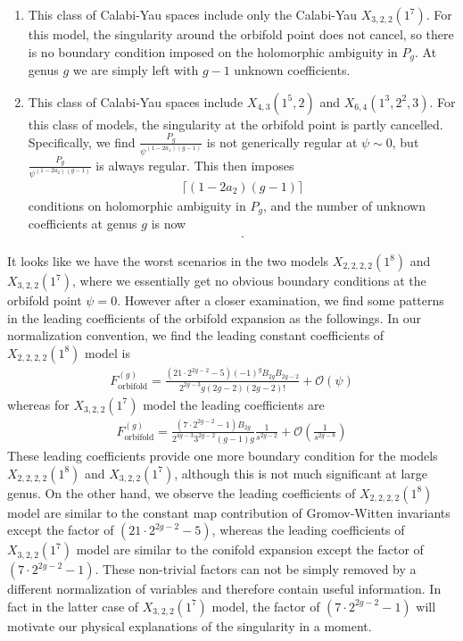 \documentclass[12pt]{article}
\begin{document}
\begin{enumerate}
\item This class of Calabi-Yau spaces include only the Calabi-Yau $X_{3,2,2}(1^7)$.
For this model, the singularity around the orbifold point does not
cancel, so there is no boundary condition imposed on the
holomorphic ambiguity in $P_g$. At genus $g$ we are simply left
with $g-1$ unknown coefficients.

\item This class of Calabi-Yau spaces include $X_{4,3}(1^5,2)$ and
$X_{6,4}(1^3,2^2,3)$. For this class of models, the singularity at
the orbifold point is partly cancelled. Specifically, we find
$\frac{P_g}{\psi^{(1-2a_1)(g-1)}}$ is not generically regular at
$\psi\sim 0$, but $\frac{P_g}{\psi^{(1-2a_2)(g-1)}}$ is always
regular. This then imposes
\begin{eqnarray}
\lceil(1-2a_2)(g-1)\rceil
\end{eqnarray}
conditions on holomorphic ambiguity in $P_g$, and the number of
unknown coefficients at genus $g$ is now
\begin{eqnarray}
[2a_2(g-1)].
\end{eqnarray}

\end{enumerate}

It looks like we have the worst scenarios in the two models
$X_{2,2,2,2}(1^8)$ and $X_{3,2,2}(1^7)$, where we essentially get
no obvious boundary conditions at the orbifold point $\psi=0$.
However after a closer examination, we find some patterns in the
leading coefficients of the orbifold expansion as the followings.
In our normalization convention, we find the leading constant
coefficients of $X_{2,2,2,2}(1^8)$ model is
\begin{eqnarray}
F^{(g)}_{\textrm{orbifold}}=\frac{(21\cdot2^{2g-2}-5)(-1)^{g}B_{2g}B_{2g-2}}{2^{2g-3}g(2g-2)(2g-2)!}
+\mathcal{O}(\psi)
\end{eqnarray}
whereas for $X_{3,2,2}(1^7)$ model the leading coefficients are
\begin{eqnarray} \label{twoparticles-12-01}
F^{(g)}_{\textrm{orbifold}}=
\frac{(7\cdot2^{2g-2}-1)B_{2g}}{2^{4g-3}3^{2g-2}(g-1)g}
\frac{1}{s^{2g-2}}+\mathcal{O}(\frac{1}{s^{2g-8}})
\end{eqnarray}
These leading coefficients provide one more boundary condition for
the models $X_{2,2,2,2}(1^8)$ and $X_{3,2,2}(1^7)$, although this
is not much significant at large genus. On the other hand, we
observe the leading coefficients of $X_{2,2,2,2}(1^8)$ model are
similar to the constant map contribution of Gromov-Witten
invariants except the factor of $(21\cdot2^{2g-2}-5)$, whereas the
leading coefficients of $X_{3,2,2}(1^7)$ model are similar to the
conifold expansion except the factor of $(7\cdot2^{2g-2}-1)$.
These non-trivial factors can not be simply removed by a different
normalization of variables and therefore contain useful
information. In fact in the latter case of $X_{3,2,2}(1^7)$ model,
the factor of $(7\cdot2^{2g-2}-1)$ will motivate our physical
explanations of the singularity in a moment.
\end{document}
